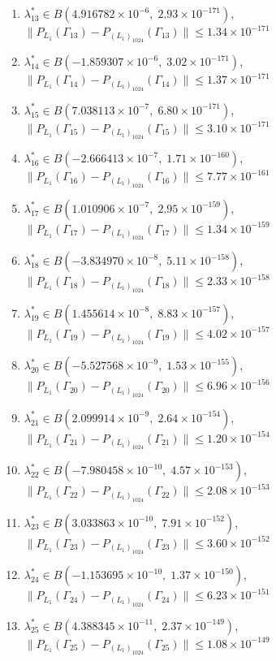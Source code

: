 \begin{enumerate}
\item $\lambda_{13}^* \in B(4.916782 \times 10^{-6},\; 2.93 \times 10^{-171})$, \quad $\|P_{L_1}(\Gamma_{13}) - P_{(L_1)_{1024}}(\Gamma_{13})\| \leq 1.34 \times 10^{-171}$
\item $\lambda_{14}^* \in B(-1.859307 \times 10^{-6},\; 3.02 \times 10^{-171})$, \quad $\|P_{L_1}(\Gamma_{14}) - P_{(L_1)_{1024}}(\Gamma_{14})\| \leq 1.37 \times 10^{-171}$
\item $\lambda_{15}^* \in B(7.038113 \times 10^{-7},\; 6.80 \times 10^{-171})$, \quad $\|P_{L_1}(\Gamma_{15}) - P_{(L_1)_{1024}}(\Gamma_{15})\| \leq 3.10 \times 10^{-171}$
\item $\lambda_{16}^* \in B(-2.666413 \times 10^{-7},\; 1.71 \times 10^{-160})$, \quad $\|P_{L_1}(\Gamma_{16}) - P_{(L_1)_{1024}}(\Gamma_{16})\| \leq 7.77 \times 10^{-161}$
\item $\lambda_{17}^* \in B(1.010906 \times 10^{-7},\; 2.95 \times 10^{-159})$, \quad $\|P_{L_1}(\Gamma_{17}) - P_{(L_1)_{1024}}(\Gamma_{17})\| \leq 1.34 \times 10^{-159}$
\item $\lambda_{18}^* \in B(-3.834970 \times 10^{-8},\; 5.11 \times 10^{-158})$, \quad $\|P_{L_1}(\Gamma_{18}) - P_{(L_1)_{1024}}(\Gamma_{18})\| \leq 2.33 \times 10^{-158}$
\item $\lambda_{19}^* \in B(1.455614 \times 10^{-8},\; 8.83 \times 10^{-157})$, \quad $\|P_{L_1}(\Gamma_{19}) - P_{(L_1)_{1024}}(\Gamma_{19})\| \leq 4.02 \times 10^{-157}$
\item $\lambda_{20}^* \in B(-5.527568 \times 10^{-9},\; 1.53 \times 10^{-155})$, \quad $\|P_{L_1}(\Gamma_{20}) - P_{(L_1)_{1024}}(\Gamma_{20})\| \leq 6.96 \times 10^{-156}$
\item $\lambda_{21}^* \in B(2.099914 \times 10^{-9},\; 2.64 \times 10^{-154})$, \quad $\|P_{L_1}(\Gamma_{21}) - P_{(L_1)_{1024}}(\Gamma_{21})\| \leq 1.20 \times 10^{-154}$
\item $\lambda_{22}^* \in B(-7.980458 \times 10^{-10},\; 4.57 \times 10^{-153})$, \quad $\|P_{L_1}(\Gamma_{22}) - P_{(L_1)_{1024}}(\Gamma_{22})\| \leq 2.08 \times 10^{-153}$
\item $\lambda_{23}^* \in B(3.033863 \times 10^{-10},\; 7.91 \times 10^{-152})$, \quad $\|P_{L_1}(\Gamma_{23}) - P_{(L_1)_{1024}}(\Gamma_{23})\| \leq 3.60 \times 10^{-152}$
\item $\lambda_{24}^* \in B(-1.153695 \times 10^{-10},\; 1.37 \times 10^{-150})$, \quad $\|P_{L_1}(\Gamma_{24}) - P_{(L_1)_{1024}}(\Gamma_{24})\| \leq 6.23 \times 10^{-151}$
\item $\lambda_{25}^* \in B(4.388345 \times 10^{-11},\; 2.37 \times 10^{-149})$, \quad $\|P_{L_1}(\Gamma_{25}) - P_{(L_1)_{1024}}(\Gamma_{25})\| \leq 1.08 \times 10^{-149}$

\end{enumerate}

